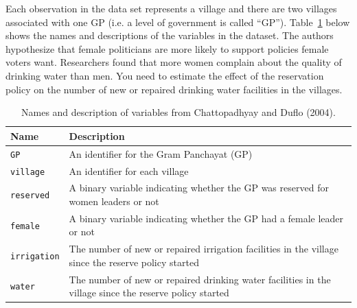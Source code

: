\documentclass[12pt,letterpaper]{article}
\begin{document}
	
	\noindent Each observation in the data set represents a village and there are two villages associated with one GP (i.e. a level of government is called ``GP''). Table~\ref{tab:women_desc} below shows the names and descriptions of the variables in the dataset. The authors hypothesize that female politicians are more likely to support policies female voters want. Researchers found that more women complain about the quality of drinking water than men. You need to estimate the effect of the reservation policy on the number of new or repaired drinking water facilities in the villages.
	\vspace{.5cm}
	\begin{table}[H]
		\centering
		\caption{\footnotesize{Names and description of variables from Chattopadhyay and Duflo (2004).}}
		\label{tab:women_desc}
		\vspace{.25cm}
		\begin{tabular}{l p{11cm}}
			\hline
			Name & Description \\
			\hline
			\texttt{GP} & An identifier for the Gram Panchayat (GP) \\
			\texttt{village} & An identifier for each village \\
			\texttt{reserved} & A binary variable indicating whether the GP was reserved for women leaders or not \\
			\texttt{female} & A binary variable indicating whether the GP had a female leader or not \\
			\texttt{irrigation} & The number of new or repaired irrigation facilities in the village since the reserve policy started \\
			\texttt{water} & The number of new or repaired drinking water facilities in the village since the reserve policy started \\
			\hline
		\end{tabular}
	\end{table}		
	
\end{document}
